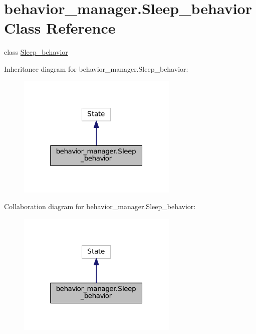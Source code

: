 \hypertarget{classbehavior__manager_1_1Sleep__behavior}{}\section{behavior\+\_\+manager.\+Sleep\+\_\+behavior Class Reference}
\label{classbehavior__manager_1_1Sleep__behavior}


class \hyperlink{classbehavior__manager_1_1Sleep__behavior}{Sleep\+\_\+behavior}  




Inheritance diagram for behavior\+\_\+manager.\+Sleep\+\_\+behavior\+:
\nopagebreak
\begin{figure}[H]
\begin{center}
\leavevmode
\includegraphics[width=217pt]{classbehavior__manager_1_1Sleep__behavior__inherit__graph}
\end{center}
\end{figure}


Collaboration diagram for behavior\+\_\+manager.\+Sleep\+\_\+behavior\+:
\nopagebreak
\begin{figure}[H]
\begin{center}
\leavevmode
\includegraphics[width=217pt]{classbehavior__manager_1_1Sleep__behavior__coll__graph}
\end{center}
\end{figure}
